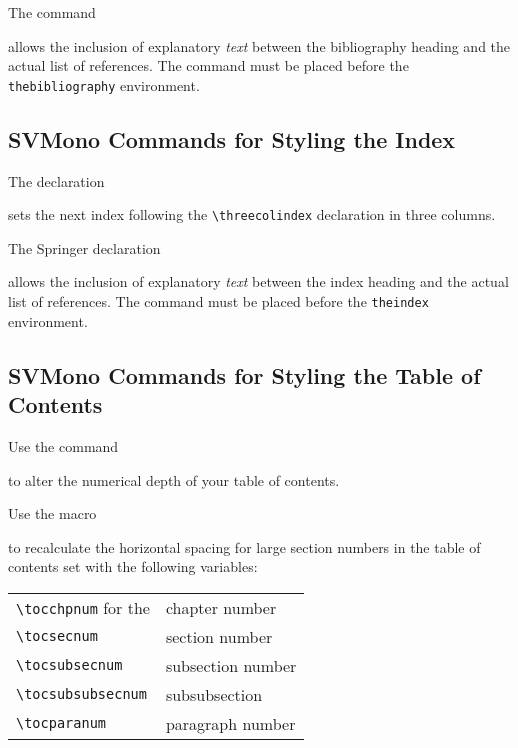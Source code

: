 \documentclass[graybox,square]{svmono}
\begin{document}
\begin{sloppy}
The command

\cprotect{}

allows the inclusion of explanatory {\it text} between the bibliography heading and the actual list of references. The command must be placed before the \verb|thebibliography| environment.

\subsection{SVMono Commands for Styling the Index}

The declaration

\cprotect\boxtext{\verb|\threecolindex|}

sets the next index following the \verb|\threecolindex| declaration in three columns.

\eject

The Springer declaration

\cprotect{}

allows the inclusion of explanatory {\it text} between the index heading and the actual list of references. The command must be placed before the \verb|theindex| environment.


\subsection{SVMono Commands for Styling the Table of Contents}

Use the command

\cprotect\boxtext{\verb|\setcounter{tocdepth}{number}|}

to alter the numerical depth of your table of contents.

Use the macro

\cprotect\boxtext{\verb|\calctocindent|}

to recalculate the horizontal spacing for large section numbers in the table of contents set with the following variables:

\begin{tabular}{l@{\qquad}l}
\verb|\tocchpnum| for the & chapter number\\
\verb|\tocsecnum| & section number\\
\verb|\tocsubsecnum| & subsection number\\
\verb|\tocsubsubsecnum| & subsubsection\\
\verb|\tocparanum| & paragraph number\\
\end{tabular}


\end{sloppy}
\end{document}
